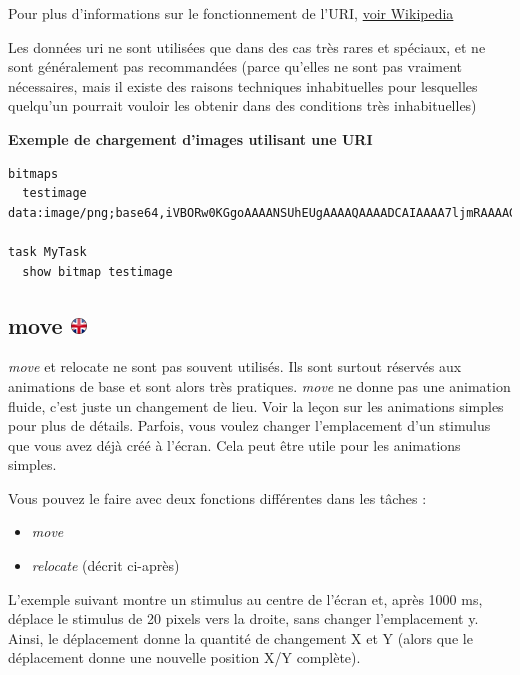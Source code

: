\documentclass[
]{book}
\providecommand{\tightlist}{%
  \setlength{\itemsep}{0pt}\setlength{\parskip}{0pt}}
\begin{document}
Pour plus d'informations sur le fonctionnement de l'URI,
\href{http://en.wikipedia.org/wiki/Data_URI_scheme}{voir Wikipedia}

Les données uri ne sont utilisées que dans des cas très rares et
spéciaux, et ne sont généralement pas recommandées (parce qu'elles ne
sont pas vraiment nécessaires, mais il existe des raisons techniques
inhabituelles pour lesquelles quelqu'un pourrait vouloir les obtenir
dans des conditions très inhabituelles)

\textbf{Exemple de chargement d'images utilisant une URI}

\begin{verbatim}
bitmaps
  testimage data:image/png;base64,iVBORw0KGgoAAAANSUhEUgAAAAQAAAADCAIAAAA7ljmRAAAAGElEQVQIW2P4DwcMDAxAfBvMAhEQMYgcACEHG8ELxtbPAAAAAElFTkSuQmCC

task MyTask
  show bitmap testimage
\end{verbatim}

\hypertarget{move}{%
\subsection[move ]{\texorpdfstring{move
\href{https://www.psytoolkit.org/doc3.2.0/syntax.html\#move}{\protect\includegraphics{img/ukflag.png}}}{move }}\label{move}}

\emph{move} et relocate ne sont pas souvent utilisés. Ils sont surtout
réservés aux animations de base et sont alors très pratiques.
\emph{move} ne donne pas une animation fluide, c'est juste un changement
de lieu. Voir la leçon sur les animations simples pour plus de détails.
Parfois, vous voulez changer l'emplacement d'un stimulus que vous avez
déjà créé à l'écran. Cela peut être utile pour les animations simples.

Vous pouvez le faire avec deux fonctions différentes dans les tâches :

\begin{itemize}
\tightlist
\item
  \emph{move}
\item
  \emph{relocate} (décrit ci-après)
\end{itemize}

L'exemple suivant montre un stimulus au centre de l'écran et, après 1000
ms, déplace le stimulus de 20 pixels vers la droite, sans changer
l'emplacement y. Ainsi, le déplacement donne la quantité de changement X
et Y (alors que le déplacement donne une nouvelle position X/Y
complète).
\end{document}
